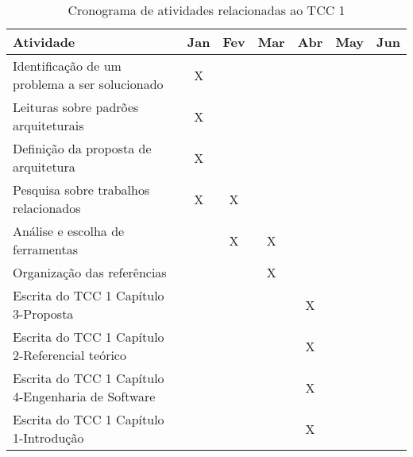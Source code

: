 \begin{table}[!h]
\centering
\caption{Cronograma de atividades relacionadas ao TCC 1}
\label{cronograma_tcc1}
\begin{tabular}{|l|c|c|c|c|c|c|}
\hline
Atividade                                                   & \multicolumn{1}{l|}{Jan} & \multicolumn{1}{l|}{Fev} & \multicolumn{1}{l|}{Mar} & \multicolumn{1}{l|}{Abr} & \multicolumn{1}{l|}{May} & \multicolumn{1}{l|}{Jun} \\ \hline
Identificação de um problema a ser solucionado              & X                           &                             &                              &                            &                             &                              \\ \hline
Leituras sobre padrões arquiteturais                        & X                           &                             &                              &                            &                             &                              \\ \hline
Definição da proposta de arquitetura                        & X                           &                             &                              &                            &                             &                              \\ \hline
Pesquisa sobre trabalhos relacionados                       & X                           & X                        &                              &                            &                             &                              \\ \hline
Análise e escolha de ferramentas                            &                             & X                        & X                            &                            &                             &                              \\ \hline
Organização das referências                                 &                             &                             & X                            &                              \\ \hline
Escrita do TCC 1 Capítulo 3-Proposta                        &                             &                             &                              & X                            \\ \hline
Escrita do TCC 1 Capítulo 2-Referencial teórico             &                             &                             &                              & X                            \\ \hline
Escrita do TCC 1 Capítulo 4-Engenharia de Software          &                             &                             &                              & X                            \\ \hline
Escrita do TCC 1 Capítulo 1-Introdução                      &                             &                             &                              & X                            \\ \hline
\end{tabular}
\end{table}


